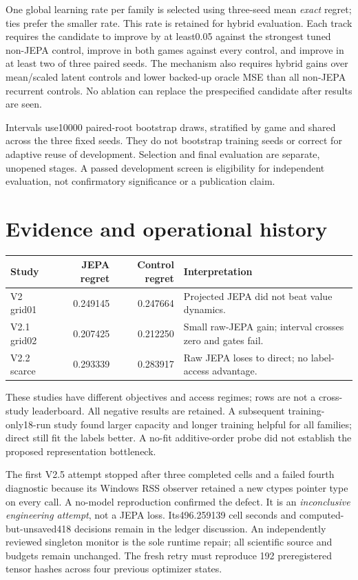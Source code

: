 \documentclass[11pt,a4paper]{article}
\begin{document}
One global learning rate per family is selected using three-seed mean
\emph{exact} regret; ties prefer the smaller rate. This rate is retained for
hybrid evaluation. Each track requires the candidate to improve by at least0.05
against the strongest tuned non-JEPA control, improve in both games against
every control, and improve in at least two of three paired seeds. The mechanism
also requires hybrid gains over mean/scaled latent controls and lower backed-up
oracle MSE than all non-JEPA recurrent controls. No ablation can replace the
prespecified candidate after results are seen.

Intervals use10000 paired-root bootstrap draws, stratified by game and shared
across the three fixed seeds. They do not bootstrap training seeds or correct
for adaptive reuse of development. Selection and final evaluation are separate,
unopened stages. A passed development screen is eligibility for independent
evaluation, not confirmatory significance or a publication claim.

\section{Evidence and operational history}
\begin{center}\small
\begin{tabular}{lrrp{63mm}}
\toprule Study & JEPA regret & Control regret & Interpretation\\\midrule
V2 grid01 &0.249145&0.247664&Projected JEPA did not beat value dynamics.\\
V2.1 grid02 &0.207425&0.212250&Small raw-JEPA gain; interval crosses zero and gates fail.\\
V2.2 scarce &0.293339&0.283917&Raw JEPA loses to direct; no label-access advantage.\\\bottomrule
\end{tabular}\end{center}
These studies have different objectives and access regimes; rows are not a
cross-study leaderboard. All negative results are retained. A subsequent
training-only18-run study found larger capacity and longer training helpful
for all families; direct still fit the labels better. A no-fit additive-order
probe did not establish the proposed representation bottleneck.

The first V2.5 attempt stopped after three completed cells and a failed fourth
diagnostic because its Windows RSS observer retained a new ctypes pointer type
on every call. A no-model reproduction confirmed the defect. It is an
\emph{inconclusive engineering attempt}, not a JEPA loss. Its496.259139 cell
seconds and computed-but-unsaved418 decisions remain in the ledger discussion.
An independently reviewed singleton monitor is the sole runtime repair; all
scientific source and budgets remain unchanged. The fresh retry must reproduce
192 preregistered tensor hashes across four previous optimizer states.
\end{document}
